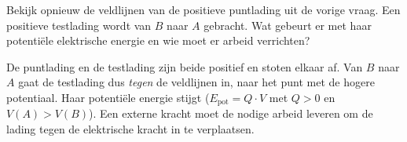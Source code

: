 \documentclass{ximera}
\begin{document}
\begin{question}
    Bekijk opnieuw de veldlijnen van de positieve puntlading uit de vorige vraag. Een positieve testlading wordt van $B$ naar $A$ gebracht. Wat gebeurt er met haar potentiële elektrische energie en wie moet er arbeid verrichten?

    \begin{multipleChoice}
    \end{multipleChoice}

    \begin{solution}\nl
        De puntlading en de testlading zijn beide positief en stoten elkaar af. Van $B$ naar $A$ gaat de testlading dus \emph{tegen} de veldlijnen in, naar het punt met de hogere potentiaal. Haar potentiële energie stijgt ($E_{\text{pot}} = Q \cdot V$ met $Q > 0$ en $V(A) > V(B)$). Een externe kracht moet de nodige arbeid leveren om de lading tegen de elektrische kracht in te verplaatsen.
    \end{solution}
\end{question}
\end{document}
